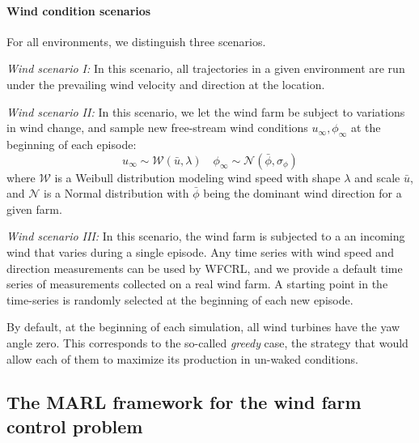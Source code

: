 \documentclass{article}
\newcommand{\md}[1]{{\color{red}#1}}
\begin{document}
\paragraph{Wind condition scenarios}
For all environments, we distinguish three scenarios. 

\textit{Wind scenario I:}
In this scenario, all trajectories in a given environment are run under the prevailing wind velocity and direction at the location. 

\textit{Wind scenario II:}
In this scenario, we let the wind farm be subject to variations in wind change, and sample new free-stream wind conditions $u_\infty, \phi_\infty$ at the beginning of each episode: 
\begin{equation}
    u_\infty \sim \mathcal{W}(\bar{u}, \lambda) \quad
    \phi_\infty \sim \mathcal{N}(\bar{\phi}, \sigma_\phi)
\end{equation}
where $\mathcal{W}$ is a Weibull distribution modeling wind speed with shape $\lambda$ and scale $\bar{u}$, and $\mathcal{N}$ is a Normal distribution with $\bar{\phi}$ being the dominant wind direction for a given farm. 

\textit{Wind scenario III:}
In this scenario, the wind farm is subjected to a an incoming wind that varies during a single episode. Any time series with wind speed and direction measurements can be used by WFCRL, and we provide a default time series of measurements collected on a real wind farm. A starting point in the time-series is randomly selected at the beginning of each new episode.

By default, at the beginning of each simulation, all wind turbines have the yaw angle zero.
This corresponds to the so-called \textit{greedy} case, the strategy that would allow each of them to maximize its production in un-waked conditions.

%
%
%
\subsection{The MARL framework for the wind farm control problem}\label{sec:marl}
\end{document}
